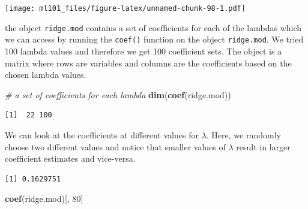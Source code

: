 \documentclass[]{article}
\newenvironment{Shaded}{\begin{snugshade}}{\end{snugshade}}
\newcommand{\CommentTok}[1]{\textcolor[rgb]{0.56,0.35,0.01}{\textit{#1}}}
\newcommand{\DecValTok}[1]{\textcolor[rgb]{0.00,0.00,0.81}{#1}}
\newcommand{\KeywordTok}[1]{\textcolor[rgb]{0.13,0.29,0.53}{\textbf{#1}}}
\newcommand{\NormalTok}[1]{#1}
\newcommand{\OperatorTok}[1]{\textcolor[rgb]{0.81,0.36,0.00}{\textbf{#1}}}
\begin{document}
\texttt{[image: ml101\_files/figure-latex/unnamed-chunk-98-1.pdf]}

the object \texttt{ridge.mod} contains a set of coefficients for each of the lambdas which we can access by running the \texttt{coef()} function on the object \texttt{ridge.mod}. We tried 100 lambda values and therefore we get 100 coefficient sets. The object is a matrix where rows are variables and columns are the coefficients based on the chosen lambda values.

\begin{Shaded}
\begin{Highlighting}[]
\CommentTok{# a set of coefficients for each lambda}
\KeywordTok{dim}\NormalTok{(}\KeywordTok{coef}\NormalTok{(ridge.mod))}
\end{Highlighting}
\end{Shaded}

\begin{verbatim}
[1]  22 100
\end{verbatim}

We can look at the coefficients at different values for \(\lambda\). Here, we randomly choose two different values and notice that smaller values of \(\lambda\) result in larger coefficient estimates and vice-versa.

\begin{Shaded}
\end{Shaded}

\begin{verbatim}
[1] 0.1629751
\end{verbatim}

\begin{Shaded}
\begin{Highlighting}[]
\KeywordTok{coef}\NormalTok{(ridge.mod)[, }\DecValTok{80}\NormalTok{]}
\end{Highlighting}
\end{Shaded}
\end{document}
